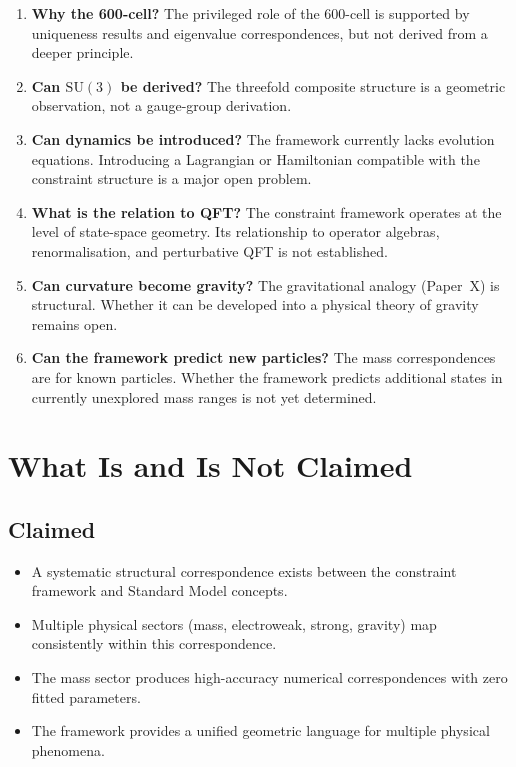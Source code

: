 \documentclass[12pt]{article}
\begin{document}
\begin{enumerate}
    \item \textbf{Why the 600-cell?} The privileged role of the 600-cell is supported by uniqueness results and eigenvalue correspondences, but not derived from a deeper principle.
    \item \textbf{Can $\mathrm{SU}(3)$ be derived?} The threefold composite structure is a geometric observation, not a gauge-group derivation.
    \item \textbf{Can dynamics be introduced?} The framework currently lacks evolution equations. Introducing a Lagrangian or Hamiltonian compatible with the constraint structure is a major open problem.
    \item \textbf{What is the relation to QFT?} The constraint framework operates at the level of state-space geometry. Its relationship to operator algebras, renormalisation, and perturbative QFT is not established.
    \item \textbf{Can curvature become gravity?} The gravitational analogy (Paper~X) is structural. Whether it can be developed into a physical theory of gravity remains open.
    \item \textbf{Can the framework predict new particles?} The mass correspondences are for known particles. Whether the framework predicts additional states in currently unexplored mass ranges is not yet determined.
\end{enumerate}

\section{What Is and Is Not Claimed}\label{sec:claims}

\subsection*{Claimed}

\begin{itemize}
    \item A systematic structural correspondence exists between the constraint framework and Standard Model concepts.
    \item Multiple physical sectors (mass, electroweak, strong, gravity) map consistently within this correspondence.
    \item The mass sector produces high-accuracy numerical correspondences with zero fitted parameters.
    \item The framework provides a unified geometric language for multiple physical phenomena.
\end{itemize}
\end{document}

